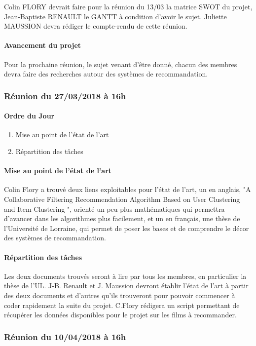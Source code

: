 \documentclass{article}
\begin{document}
Colin FLORY devrait faire pour la réunion du 13/03 la matrice SWOT du projet, Jean-Baptiste RENAULT le GANTT à condition d'avoir le sujet. Juliette MAUSSION devra rédiger le compte-rendu de cette réunion.
\paragraph*{Avancement du projet}\mbox{}

Pour la prochaine réunion, le sujet venant d'être donné, chacun des membres devra faire des recherches autour des systèmes de recommandation.

\subsubsection*{Réunion du 27/03/2018 à 16h}
\paragraph*{Ordre du Jour}
\begin{enumerate}
\item Mise au point de l'état de l'art
\item Répartition des tâches
\end{enumerate}
\paragraph*{Mise au point de l'état de l'art}\mbox{}
Colin Flory a trouvé deux liens exploitables pour l’état de l’art, un en anglais, "A Collaborative Filtering Recommendation Algorithm Based on User Clustering and Item Clustering ", orienté un peu plus mathématiques qui permettra d’avancer dans les algorithmes plus facilement, et un en français, une thèse de l’Université de Lorraine, qui permet de poser les bases et de comprendre le décor des systèmes de
recommandation.
\paragraph*{Répartition des tâches}\mbox{}
Les deux documents trouvés seront à lire par tous les membres, en particulier la thèse de l’UL.
J-B. Renault et J. Maussion devront établir l’état de l’art à partir des deux documents et d’autres qu’ils trouveront pour pouvoir commencer à coder rapidement la suite du projet.
C.Flory rédigera un script permettant de récupérer les données disponibles pour le projet sur les films à recommander.

\subsubsection*{Réunion du 10/04/2018 à 16h}
\end{document}
